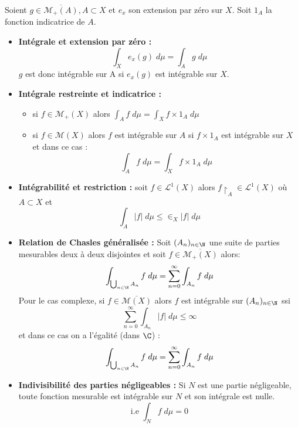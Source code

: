\begin{prop}
    Soient $g \in \overline{\mathcal{M}_+(A)}, A \subset X$ et $e_x$ son extension par zéro sur $X$.
    Soit $1_A$ la fonction indicatrice de $A$.
    \begin{itemize}
        \item \textbf{Intégrale et extension par zéro :}
            \[ \int_{X} e_x(g) \; d \mu = \int_{A} g \; d \mu \] 
            $g$ est donc intégrable sur A si $e_x(g)$ est intégrable sur $X$.
        \item \textbf{Intégrale restreinte et indicatrice :}
            \begin{itemize}
                \item si $f \in \mathcal{M}_+(X)$ alors $\int_{A} f \; d \mu = \int_{X} f \times 1_A \; d \mu $ 
                \item si $f \in \mathcal{M}(X)$ alors $f$ est intégrable sur $A$ si $f \times 1_A$ est intégrable sur $X$ et dans ce cas :
                    \[ \boxed{ \int_{A} f \; d \mu = \int_{X} f \times 1_A \; d \mu } \] 
            \end{itemize}
        \item \textbf{Intégrabilité et restriction :} soit $f \in \mathcal{L}^1(X)$ alors $f\restriction_A \in \mathcal{L}^1(X)$ où $A \subset X$ et 
                \[ \int_A |f| \; d \mu \leq \in_X |f| \; d \mu \]
        \item \textbf{Relation de Chasles généralisée :} Soit $(A_n)_{n\in\N}$ une suite de parties 
            mesurables deux à deux disjointes et soit $f \in \overline{\mathcal{M}_+(X)}$ alors: 
                \[ \int_{\bigcup_{n \in \N} A_n} f \; d \mu = \sum_{n=0}^{\infty} \int_{A_n} f \; d \mu \]
            Pour le cas complexe, si $f \in \overline{\mathcal{M}(X)}$  alors $f$ est intégrable sur $(A_n)_{n\in\N}$ 
            ssi $$\sum_{n=0}^{\infty} \int_{A_n} |f| \; d \mu \le \infty $$
            et dans ce cas on a l'égalité (dans $\C$) :
                \[ \int_{\bigcup_{n \in \N} A_n} f \; d \mu = \sum_{n=0}^{\infty} \int_{A_n} f \; d \mu \]
        \item \textbf{Indivisibilité des parties négligeables :} Si $N$ est une partie négligeable, toute fonction mesurable est intégrable sur $N$ et son intégrale est nulle.
                \[ \text{i.e } \int_N f \; d \mu = 0 \]
    \end{itemize}
\end{prop}
\newpage

